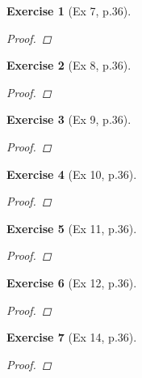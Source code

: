 \documentclass[11pt]{article}
\newtheorem{exercise}{Exercise}
\begin{document}
\begin{exercise}[Ex 7, p.36]
	\begin{proof}
		
	\end{proof}
\end{exercise}
\begin{exercise}[Ex 8, p.36]
	\begin{proof}
		
	\end{proof}
\end{exercise}
\begin{exercise}[Ex 9, p.36]
	\begin{proof}
		
	\end{proof}
\end{exercise}
\begin{exercise}[Ex 10, p.36]
	\begin{proof}
		
	\end{proof}
\end{exercise}
\begin{exercise}[Ex 11, p.36]
	\begin{proof}
		
	\end{proof}
\end{exercise}
\begin{exercise}[Ex 12, p.36]
	\begin{proof}
		
	\end{proof}
\end{exercise}
\begin{exercise}[Ex 14, p.36]
	\begin{proof}
		
	\end{proof}
\end{exercise}
\end{document}

